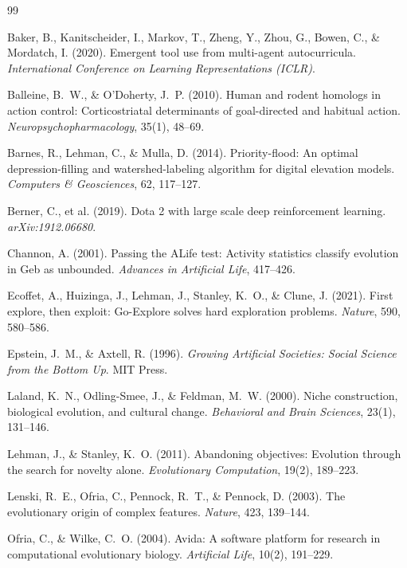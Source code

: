 \documentclass[12pt,a4paper]{article}
\begin{document}
\begin{thebibliography}{99}

Baker, B., Kanitscheider, I., Markov, T., Zheng, Y., Zhou, G., Bowen, C., \& Mordatch, I. (2020).
Emergent tool use from multi-agent autocurricula.
\textit{International Conference on Learning Representations (ICLR)}.

Balleine, B.~W., \& O'Doherty, J.~P. (2010).
Human and rodent homologs in action control: Corticostriatal determinants of goal-directed and habitual action.
\textit{Neuropsychopharmacology}, 35(1), 48--69.

Barnes, R., Lehman, C., \& Mulla, D. (2014).
Priority-flood: An optimal depression-filling and watershed-labeling algorithm for digital elevation models.
\textit{Computers \& Geosciences}, 62, 117--127.

Berner, C., et al. (2019).
Dota 2 with large scale deep reinforcement learning.
\textit{arXiv:1912.06680}.

Channon, A. (2001).
Passing the ALife test: Activity statistics classify evolution in Geb as unbounded.
\textit{Advances in Artificial Life}, 417--426.

Ecoffet, A., Huizinga, J., Lehman, J., Stanley, K.~O., \& Clune, J. (2021).
First explore, then exploit: Go-Explore solves hard exploration problems.
\textit{Nature}, 590, 580--586.

Epstein, J.~M., \& Axtell, R. (1996).
\textit{Growing Artificial Societies: Social Science from the Bottom Up}.
MIT Press.

Laland, K.~N., Odling-Smee, J., \& Feldman, M.~W. (2000).
Niche construction, biological evolution, and cultural change.
\textit{Behavioral and Brain Sciences}, 23(1), 131--146.

Lehman, J., \& Stanley, K.~O. (2011).
Abandoning objectives: Evolution through the search for novelty alone.
\textit{Evolutionary Computation}, 19(2), 189--223.

Lenski, R.~E., Ofria, C., Pennock, R.~T., \& Pennock, D. (2003).
The evolutionary origin of complex features.
\textit{Nature}, 423, 139--144.

Ofria, C., \& Wilke, C.~O. (2004).
Avida: A software platform for research in computational evolutionary biology.
\textit{Artificial Life}, 10(2), 191--229.


\end{thebibliography}
\end{document}
